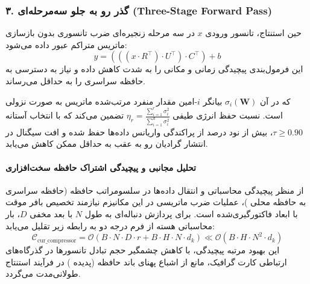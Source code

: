 \subsubsection*{۳. گذر رو به جلو سه‌مرحله‌ای (Three-Stage Forward Pass)}
حین استنتاج، تانسور ورودی $x$ در سه مرحله زنجیره‌ای ضرب تانسوری بدون بازسازی ماتریس متراکم عبور داده می‌شود:
\begin{equation}
y = \left( \left( (x \cdot R^\top) \cdot U^\top \right) \cdot C^\top \right) + b
\end{equation}
این فرمول‌بندی پیچیدگی زمانی و مکانی را به شدت کاهش داده و نیاز به دسترسی به حافظه سراسری را به حداقل می‌رساند.

که در آن $\sigma_i(\mathbf{W})$ بیانگر $i$-امین مقدار منفرد مرتب‌شده ماتریس به صورت نزولی است. نسبت حفظ انرژی طیفی $\eta_r = \frac{\sum_{i=1}^r \sigma_i^2}{\sum_{i=1}^{d} \sigma_i^2}$ تضمین می‌کند که با انتخاب آستانه $\tau \ge 0.90$، بیش از نود درصد از پراکندگی واریانس داده‌ها حفظ شده و افت سیگنال در انتشار گرادیان رو به عقب به حداقل ممکن کاهش می‌یابد.

\paragraph{تحلیل مجانبی و پیچیدگی اشتراک حافظه سخت‌افزاری}
از منظر پیچیدگی محاسباتی و انتقال داده‌ها در سلسومراتب حافظه (حافظه سراسری  به حافظه محلی )، عملیات ضرب ماتریسی در این مکانیزم نیازمند تخصیص بافر موقت با ابعاد فاکتورگیری‌شده است. برای پردازش دنباله‌ای به طول $N$ با بعد مخفی $D$، بار محاسباتی هسته از فرم درجه دو به رابطه زیر تقلیل می‌یابد:
\begin{equation}
\label{eq:complexity_cur_compressor}
\mathcal{C}_{\text{cur\_compressor}} = \mathcal{O}\left( B \cdot N \cdot D \cdot r + B \cdot H \cdot N \cdot d_k \right) \ll \mathcal{O}\left( B \cdot H \cdot N^2 \cdot d_k \right)
\end{equation}
این بهبود مرتبه پیچیدگی، با کاهش چشمگیر حجم تبادل تانسورها در گذرگاه‌های ارتباطی کارت گرافیک، مانع از اشباع پهنای باند حافظه (پدیده ) در فرآیند استنتاج طولانی‌مدت می‌گردد.
